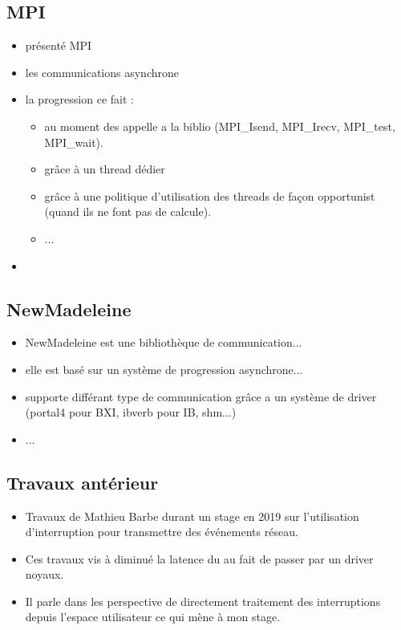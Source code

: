 \subsection{MPI}

\begin{itemize}
  \item présenté MPI
  \item les communications asynchrone
  \item la progression ce fait :
  \begin{itemize}
    \item au moment des appelle a la biblio (MPI_Isend, MPI_Irecv, MPI_test, MPI_wait).
    \item grâce à un thread dédier
    \item grâce à une politique d'utilisation des threads de façon opportunist (quand ils ne font pas de calcule).
    \item ...
  \end{itemize}
  \item 
\end{itemize}

\subsection{NewMadeleine}

\begin{itemize}
  \item NewMadeleine est une bibliothèque de communication...
  \item elle est basé sur un système de progression asynchrone...
  \item supporte différant type de communication grâce a un système de driver (portal4 pour BXI, ibverb pour IB, shm...)
  \item ...
\end{itemize}

\subsection{Travaux antérieur}

\begin{itemize}
  \item Travaux de Mathieu Barbe durant un stage en 2019 sur l'utilisation d'interruption pour transmettre des événements réseau.
  \item Ces travaux vis à diminué la latence du au fait de passer par un driver noyaux.
  \item Il parle dans les perspective de directement traitement des interruptions depuis l'espace utilisateur ce qui mène à mon stage.
\end{itemize}
